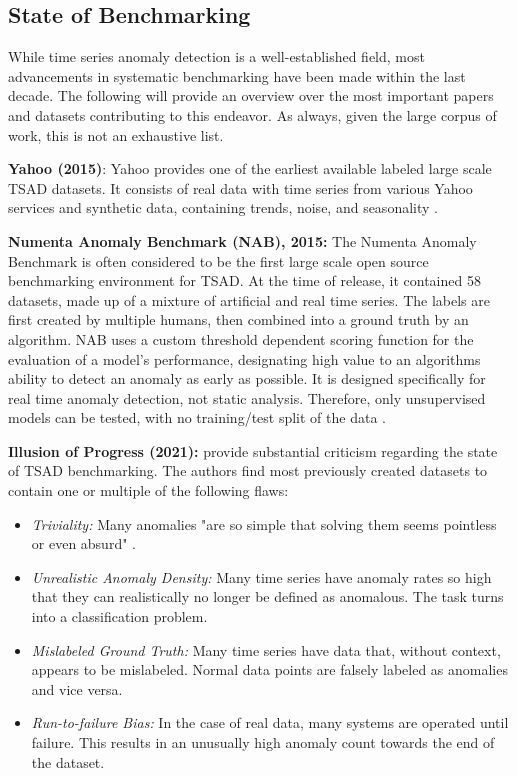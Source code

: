 \documentclass[12pt,oneside]{article}
\begin{document}
\textbf{}


\subsection{State of Benchmarking}

While time series anomaly detection is a well-established field, most advancements in systematic benchmarking have been made within the last decade. The following will provide an overview over the most important papers and datasets contributing to this endeavor. As always, given the large corpus of work, this is not an exhaustive list.  \par
\textbf{Yahoo (2015)}: Yahoo provides one of the earliest available labeled large scale TSAD datasets. It consists of real data with time series from various Yahoo services and synthetic data, containing trends, noise, and seasonality \parencite{Yahoo}. \par
\textbf{Numenta Anomaly Benchmark (NAB), 2015:} The Numenta Anomaly Benchmark is often considered to be the first large scale open source benchmarking environment for TSAD. At the time of release, it contained 58 datasets, made up of a mixture of artificial and real time series. The labels are first created by multiple humans, then combined into a ground truth by an algorithm. NAB uses a custom threshold dependent scoring function for the evaluation of a model's performance, designating high value to an algorithms ability to detect an anomaly as early as possible. It is designed specifically for real time anomaly detection, not static analysis. Therefore, only unsupervised models can be tested, with no training/test split of the data \parencites{Lavin_2015}.\par
\textbf{Illusion of Progress (2021):} \cite{wu2021current} provide substantial criticism regarding the state of TSAD benchmarking. The authors find most previously created datasets to contain one or multiple of the following flaws:
\begin{itemize}
    \item \textit{Triviality:} Many anomalies "are so simple that solving them seems pointless or even absurd" \parencites[p.~2]{wu2021current}.
    \item \textit{Unrealistic Anomaly Density:} Many time series have anomaly rates so high that they can realistically no longer be defined as anomalous. The task turns into a classification problem.
    \item \textit{Mislabeled Ground Truth:} Many time series have data that, without context, appears to be mislabeled. Normal data points are falsely labeled as anomalies and vice versa.
    \item \textit{Run-to-failure Bias:} In the case of real data, many systems are operated until failure. This results in an unusually high anomaly count towards the end of the dataset.
\end{itemize}
\end{document}
